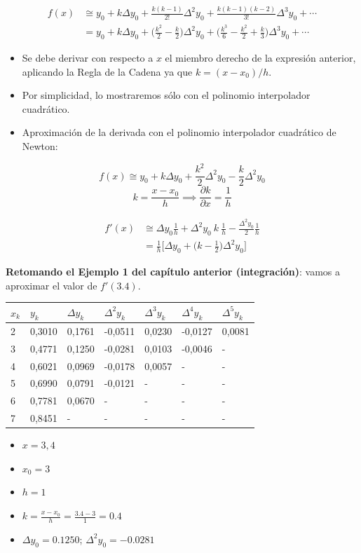 \documentclass[openany]{book}
\providecommand{\tightlist}{%
  \setlength{\itemsep}{0pt}\setlength{\parskip}{0pt}}
\begin{document}
\[
\begin{aligned}
f(x) & \cong y_0 + k \Delta y_0 + \frac{k(k-1)}{2!}\Delta^2 y_0 + \frac{k(k-1)(k-2)}{3!}\Delta^3 y_0 + \cdots \\
&= y_0 + k \Delta y_0 + \Big( \frac{k^2}{2} - \frac{k}{2} \Big) \Delta^2 y_0 + \Big( \frac{k^3}{6} - \frac{k^2}{2} + \frac{k}{3} \Big) \Delta^3 y_0  + \cdots
\end{aligned}
\]

\begin{itemize}
\tightlist
\item
  Se debe derivar con respecto a \(x\) el miembro derecho de la expresión anterior, aplicando la Regla de la Cadena ya que \(k = (x - x_0)/h\).
\item
  Por simplicidad, lo mostraremos sólo con el polinomio interpolador cuadrático.
\item
  Aproximación de la derivada con el polinomio interpolador cuadrático de Newton:
\end{itemize}

\[
f(x)  \cong y_0 + k \Delta y_0 + \frac{k^2}{2} \Delta^2 y_0 - \frac{k}{2} \Delta^2 y_0
\]
\[
k = \frac{x-x_0}{h} \implies \frac{\partial k}{\partial x} = \frac{1}{h}
\]

\[
\begin{aligned}
f'(x) & \cong \Delta y_0 \frac{1}{h} + \Delta^2 y_0 ~k~ \frac{1}{h} - \frac{\Delta^2 y_0}{2} \frac{1}{h} \\
& = \frac{1}{h} \Big[ \Delta y_0 + \Big( k-\frac{1}{2} \Big) \Delta^2 y_0 \Big]
\end{aligned}
\]

\textbf{Retomando el Ejemplo 1 del capítulo anterior (integración)}: vamos a aproximar el valor de \(f'(3.4)\).

\begin{longtable}[]{@{}lllllll@{}}
\toprule
\(x_k\) & \(y_k\) & \(\Delta y_k\) & \(\Delta^2 y_k\) & \(\Delta^3 y_k\) & \(\Delta^4 y_k\) & \(\Delta^5 y_k\)\tabularnewline
\midrule
\endhead
2 & 0,3010 & 0,1761 & -0,0511 & 0,0230 & -0,0127 & 0,0081\tabularnewline
3 & 0,4771 & 0,1250 & -0,0281 & 0,0103 & -0,0046 & -\tabularnewline
4 & 0,6021 & 0,0969 & -0,0178 & 0,0057 & - & -\tabularnewline
5 & 0,6990 & 0,0791 & -0,0121 & - & - & -\tabularnewline
6 & 0,7781 & 0,0670 & - & - & - & -\tabularnewline
7 & 0,8451 & - & - & - & - & -\tabularnewline
\bottomrule
\end{longtable}

\begin{itemize}
    \small
    \item $x = 3,4$
    \item $x_0 = 3$
    \item $h = 1$
    \item $k = \frac{x-x_0}{h} = \frac{3.4-3}{1} = 0.4$
    \item $\Delta y_0 = 0.1250$; $\Delta^2 y_0 = -0.0281$
\end{itemize}
\end{document}
